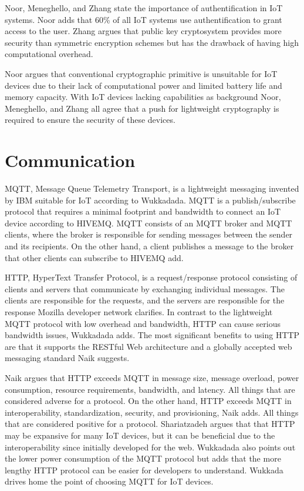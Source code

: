 Noor, Meneghello, and Zhang state the importance of authentification in IoT systems\cite{Noor2019,Meneghello2019,Zhang2014}. 
Noor adds that 60\% of all IoT systems use authentification to grant access to the user\cite{Noor2019}.  
Zhang argues that public key cryptosystem provides more security than symmetric encryption schemes but has the drawback of having high computational overhead\cite{Zhang2014}. 

Noor argues that conventional cryptographic primitive is unsuitable for IoT devices due to their lack of computational power and limited battery life and memory capacity\cite{Noor2019}.
With IoT devices lacking capabilities as background Noor, Meneghello, and Zhang all agree that a push for lightweight cryptography is required to ensure the security of these devices\cite{Noor2019,Meneghello2019,Zhang2014}. 

\section{Communication} 
MQTT, Message Queue Telemetry Transport, is a lightweight messaging invented by IBM suitable for IoT according to Wukkadada\cite{Wukkadada2018}. 
MQTT is a publish/subscribe protocol that requires a minimal footprint and bandwidth to connect an IoT device according to HIVEMQ\cite{MQTT2021}.
MQTT consists of an MQTT broker and MQTT clients, where the broker is responsible for sending messages between the sender and its recipients\cite{Wukkadada2018}.
On the other hand, a client publishes a message to the broker that other clients can subscribe to HIVEMQ add\cite{MQTT2021}.

HTTP, HyperText Transfer Protocol, is a request/response protocol consisting of clients and servers that communicate by exchanging individual messages. 
The clients are responsible for the requests, and the servers are responsible for the response Mozilla developer network clarifies\cite{HTTP2021}.  
In contrast to the lightweight MQTT protocol with low overhead and bandwidth, HTTP can cause serious bandwidth issues, Wukkadada adds\cite{Wukkadada2018}. 
The most significant benefits to using HTTP are that it supports the RESTful Web architecture and a globally accepted web messaging standard Naik suggests\cite{Naik2017}.  

Naik argues that HTTP exceeds MQTT in message size, message overload, power consumption, resource requirements, bandwidth, and latency. 
All things that are considered adverse for a protocol\cite{Naik2017}.
On the other hand, HTTP exceeds MQTT in interoperability, standardization, security, and provisioning, Naik adds.
All things that are considered positive for a protocol.
Shariatzadeh argues that that HTTP may be expansive for many IoT devices, but it can be beneficial due to the interoperability since initially developed for the web\cite{Shariatzadeh2016}.
Wukkadada also points out the lower power consumption of the MQTT protocol but adds that the more lengthy HTTP protocol can be easier for developers to understand\cite{Wukkadada2018}.
Wukkada drives home the point of choosing MQTT for IoT devices.